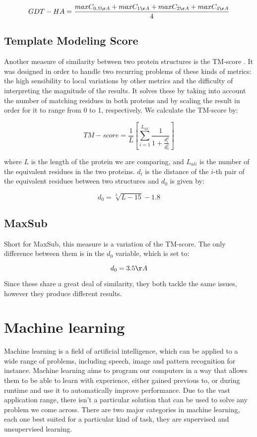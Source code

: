 $$ GDT-HA = \frac{ max C_{0.5\AA} + max C_{1\AA} + max C_{2\AA} + max C_{4\AA} } {4} $$

\subsection{Template Modeling Score}

Another measure of similarity between two protein structures is the \gls{TM-score} \cite{zhang2004scoring}. It was designed in order to handle two recurring problems of these kinds of metrics: the high sensibility to local variations by other metrics and the difficulty of interpreting the magnitude of the results. It solves these by taking into account the number of matching residues in both proteins and by scaling the result in order for it to range from 0 to 1, respectively. We calculate the TM-score by:

$$TM-score = \frac{1}{L} \left[ \sum_{i=1}^{L_{ali}} \frac{1}{1 + \frac{d_i^2}{d_0^2}}\right]$$

where $L$ is the length of the protein we are comparing, and $L_{ali}$ is the number of the equivalent residues in the two proteins. $d_i$ is the distance of the $i$-th pair of the equivalent residues between two structures and $d_0$ is given by:

$$d_0 = \sqrt[3]{L-15}-1.8$$

\subsection{MaxSub}

Short for \gls{MaxSub}, this measure is a variation of the TM-score. The only difference between them is in the $d_0$ variable, which is set to:

$$d_0 = 3.5\AA$$ 

Since these share a great deal of similarity, they both tackle the same issues, however they produce different results. 

\section{Machine learning}
Machine learning \cite{tommitchell} \cite{ethemalpaydin2010} is a field of artificial intelligence, which can be applied to a wide range of problems, including speech, image and pattern recognition for instance. Machine learning aims to program our computers in a way that allows them to be able to learn with experience, either gained previous to, or during runtime and use it to automatically improve performance. Due to the vast application range, there isn't a particular solution that can be used to solve any problem we come across. There are two major categories in machine learning, each one best suited for a particular kind of task, they are supervised and unsupervised learning.

